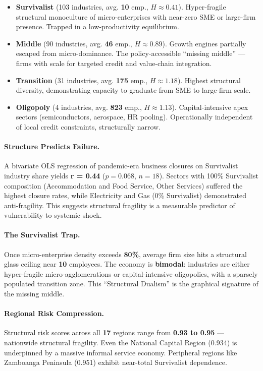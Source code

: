 \documentclass[10pt]{article}
\begin{document}
\begin{itemize}[nosep]
    \item \textbf{Survivalist} (103 industries, avg. \textbf{10} emp., $H \approx 0.41$). Hyper-fragile structural monoculture of micro-enterprises with near-zero SME or large-firm presence. Trapped in a low-productivity equilibrium.
    \item \textbf{Middle} (90 industries, avg. \textbf{46} emp., $H \approx 0.89$). Growth engines partially escaped from micro-dominance. The policy-accessible ``missing middle'' --- firms with scale for targeted credit and value-chain integration.
    \item \textbf{Transition} (31 industries, avg. \textbf{175} emp., $H \approx 1.18$). Highest structural diversity, demonstrating capacity to graduate from SME to large-firm scale.
    \item \textbf{Oligopoly} (4 industries, avg. \textbf{823} emp., $H \approx 1.13$). Capital-intensive apex sectors (semiconductors, aerospace, HR pooling). Operationally independent of local credit constraints, structurally narrow.
\end{itemize}

\paragraph{Structure Predicts Failure.} A bivariate OLS regression of pandemic-era business closures on Survivalist industry share yields \textbf{r = 0.44} ($p = 0.068$, $n = 18$). Sectors with 100\% Survivalist composition (Accommodation and Food Service, Other Services) suffered the highest closure rates, while Electricity and Gas (0\% Survivalist) demonstrated anti-fragility. This suggests structural fragility is a measurable predictor of vulnerability to systemic shock.

\paragraph{The Survivalist Trap.} Once micro-enterprise density exceeds \textbf{80\%}, average firm size hits a structural glass ceiling near \textbf{10} employees. The economy is \textbf{bimodal}: industries are either hyper-fragile micro-agglomerations or capital-intensive oligopolies, with a sparsely populated transition zone. This ``Structural Dualism'' is the graphical signature of the missing middle.

\paragraph{Regional Risk Compression.} Structural risk scores across all \textbf{17} regions range from \textbf{0.93 to 0.95} --- nationwide structural fragility. Even the National Capital Region (0.934) is underpinned by a massive informal service economy. Peripheral regions like Zamboanga Peninsula (0.951) exhibit near-total Survivalist dependence.
\end{document}
